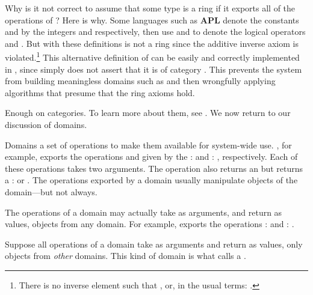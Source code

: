 Why is it not correct to assume that some type is a ring if it exports all
of the operations of ?
Here is why.
Some languages such as {\bf APL}
denote the  constants  and
 by the integers  and 
respectively, then use \spadop{+} and \spadop{*} to denote the
logical operators  and .
But with these definitions
 is not a ring since the additive inverse
axiom is violated.\footnote{There is no inverse element 
such that , or, in the usual terms:
.}
This alternative definition of  can be easily
and correctly implemented in \Language{}, since
 simply does not assert that it is of category
.
This prevents the system from building meaningless domains such as
 and then wrongfully applying
algorithms that presume that the ring axioms hold.


Enough on categories. To learn more about them, see
.
We now return to our discussion of domains.

Domains  a set of operations to make them
available for system-wide use.
, for example, exports the operations
 and  given by
the 
:  and
: ,
respectively.
Each of these operations takes two  arguments.
The  operation also returns an  but
 returns a :  or
.
The operations exported by a domain usually manipulate objects of
the domain---but not always.

The operations of a domain may actually take as arguments, and return as
values, objects from any domain.
For example,  exports the operations
: 
and :
.

Suppose all operations of a domain take as arguments and return
as values, only objects from {\it other} domains.
This kind of domain
is what \Language{} calls a .

